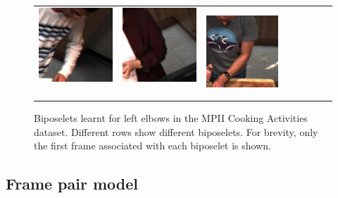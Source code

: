 \documentclass[runningheads]{llncs}
\begin{document}
\begin{figure}[t]
\begin{center}
\begin{tabular}{@{}c@{}c@{}c@{}c@{}c@{}c@{}c@{}c@{}}
\includegraphics[height=0.10\linewidth]{figures/biposelets/poselet-297/sample-5-f0.jpg}\,&
\includegraphics[height=0.10\linewidth]{figures/biposelets/poselet-297/sample-6-f0.jpg}\,&
\includegraphics[height=0.10\linewidth]{figures/biposelets/poselet-297/sample-7-f0.jpg}\\
\end{tabular}
\end{center}
\vspace{-7mm}
\caption{Biposelets learnt for left elbows in the MPII Cooking Activities
dataset. Different rows show different biposelets. For brevity,
only the first frame associated with each biposelet is shown.}
\label{fig:biposelets}
\end{figure}


\subsection{Frame pair model}\label{sec:frame-pair-model}
\end{document}
